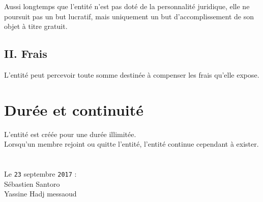 \documentclass[10pt, a4paper]{article}
\begin{document}
Aussi longtemps que l'entité n'est pas doté de la personnalité juridique, elle ne poursuit pas un but lucratif, mais uniquement un but d'accomplissement de son objet à titre gratuit.

\subsection*{II. Frais}

L'entité peut percevoir toute somme destinée à compenser les frais qu'elle expose.

\section*{Durée et continuité}

L'entité est créée pour une durée illimitée.\\

Lorsqu'un membre rejoint ou quitte l'entité, l'entité continue cependant à exister.

\vfill

\section*{}
Le \texttt{23} septembre \texttt{2017} :\\[0.2cm]
Sébastien Santoro\\[0.2cm]
Yassine Hadj messaoud
\end{document}
